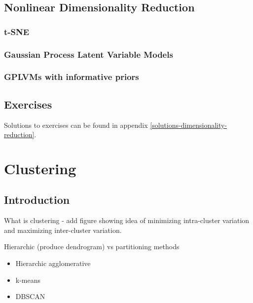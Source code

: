 \documentclass[]{book}
\providecommand{\tightlist}{%
  \setlength{\itemsep}{0pt}\setlength{\parskip}{0pt}}
\theoremstyle{definition}
\theoremstyle{definition}
\theoremstyle{definition}
\theoremstyle{remark}
\begin{document}
\section{Nonlinear Dimensionality
Reduction}\label{nonlinear-dimensionality-reduction}

\subsection{t-SNE}\label{t-sne}

\subsection{Gaussian Process Latent Variable
Models}\label{gaussian-process-latent-variable-models}

\subsection{GPLVMs with informative
priors}\label{gplvms-with-informative-priors}

\section{Exercises}\label{exercises-6}

Solutions to exercises can be found in appendix
\ref{solutions-dimensionality-reduction}.

\chapter{Clustering}\label{clustering}

\section{Introduction}\label{introduction}

What is clustering - add figure showing idea of minimizing intra-cluster
variation and maximizing inter-cluster variation.

Hierarchic (produce dendrogram) vs partitioning methods

\begin{itemize}
\tightlist
\item
  Hierarchic agglomerative
\item
  k-means
\item
  DBSCAN
\end{itemize}
\end{document}
